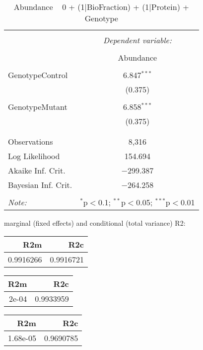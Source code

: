 \documentclass[11pt]{report}
\begin{document}
\begin{table}[!htbp] \centering 
  \caption{Abundance ~ 0 + (1|BioFraction) + (1|Protein) + Genotype} 
  \label{} 
\begin{tabular}{@{\extracolsep{5pt}}lc} 
\\[-1.8ex]\hline 
\hline \\[-1.8ex] 
 & \multicolumn{1}{c}{\textit{Dependent variable:}} \\ 
\cline{2-2} 
\\[-1.8ex] & Abundance \\ 
\hline \\[-1.8ex] 
 GenotypeControl & 6.847$^{***}$ \\ 
  & (0.375) \\ 
  & \\ 
 GenotypeMutant & 6.858$^{***}$ \\ 
  & (0.375) \\ 
  & \\ 
\hline \\[-1.8ex] 
Observations & 8,316 \\ 
Log Likelihood & 154.694 \\ 
Akaike Inf. Crit. & $-$299.387 \\ 
Bayesian Inf. Crit. & $-$264.258 \\ 
\hline 
\hline \\[-1.8ex] 
\textit{Note:}  & \multicolumn{1}{r}{$^{*}$p$<$0.1; $^{**}$p$<$0.05; $^{***}$p$<$0.01} \\ 
\end{tabular} 
\end{table} 
marginal (fixed effects) and conditional (total variance) R2:

\begin{tabular}{r|r}
\hline
R2m & R2c\\
\hline
0.9916266 & 0.9916721\\
\hline
\end{tabular}

\begin{tabular}{r|r}
\hline
R2m & R2c\\
\hline
2e-04 & 0.9933959\\
\hline
\end{tabular}

\begin{tabular}{r|r}
\hline
R2m & R2c\\
\hline
1.68e-05 & 0.9690785\\
\hline
\end{tabular}
\end{document}
